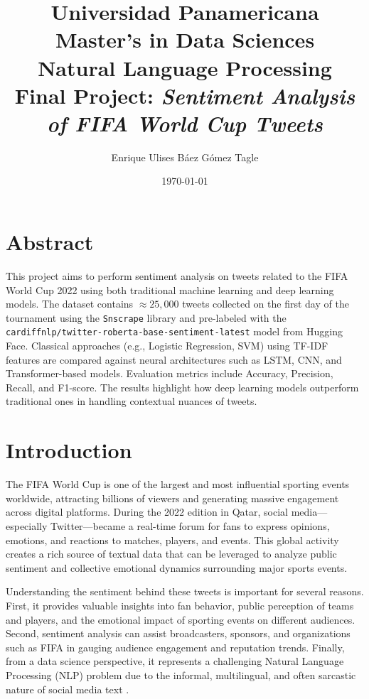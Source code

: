 \documentclass[10pt]{article}
\title{Universidad Panamericana \\ Master's in Data Sciences \\ Natural Language Processing \\ 
    \vspace{0.5cm} Final Project: \textit{Sentiment Analysis of FIFA World Cup Tweets}}
\author{Enrique Ulises Báez Gómez Tagle}
\date{\today}
\begin{document}
\maketitle
\tableofcontents
\newpage
\section*{Abstract}
This project aims to perform sentiment analysis on tweets related to the FIFA World Cup 2022 using both traditional machine learning and deep learning models. 
The dataset contains $\approx25,000$ tweets collected on the first day of the tournament using the \texttt{Snscrape} library and pre-labeled with the\\ \texttt{cardiffnlp/twitter-roberta-base-sentiment-latest} model from Hugging Face.
Classical approaches (e.g., Logistic Regression, SVM) using TF-IDF features are compared against neural architectures such as LSTM, CNN, and Transformer-based models. 
Evaluation metrics include Accuracy, Precision, Recall, and F1-score. The results highlight how deep learning models outperform traditional ones in handling contextual nuances of tweets.
\section{Introduction}
The FIFA World Cup is one of the largest and most influential sporting events worldwide, attracting billions of viewers and generating massive engagement across digital platforms. During the 2022 edition in Qatar, social media—especially Twitter—became a real-time forum for fans to express opinions, emotions, and reactions to matches, players, and events. This global activity creates a rich source of textual data that can be leveraged to analyze public sentiment and collective emotional dynamics surrounding major sports events.

Understanding the sentiment behind these tweets is important for several reasons. First, it provides valuable insights into fan behavior, public perception of teams and players, and the emotional impact of sporting events on different audiences. Second, sentiment analysis can assist broadcasters, sponsors, and organizations such as FIFA in gauging audience engagement and reputation trends. Finally, from a data science perspective, it represents a challenging Natural Language Processing (NLP) problem due to the informal, multilingual, and often sarcastic nature of social media text \cite{ref1, ref2, ref3}.
\end{document}
